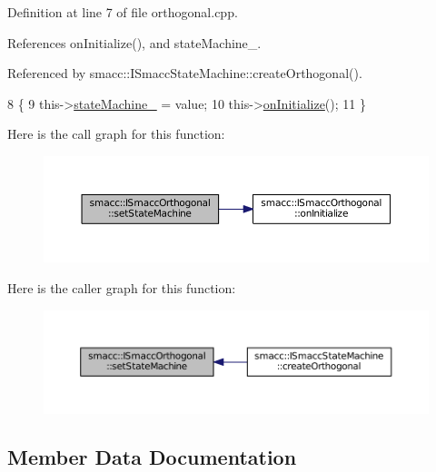 Definition at line 7 of file orthogonal.\+cpp.



References on\+Initialize(), and state\+Machine\+\_\+.



Referenced by smacc\+::\+I\+Smacc\+State\+Machine\+::create\+Orthogonal().


\begin{DoxyCode}
8 \{
9     this->\hyperlink{classsmacc_1_1ISmaccOrthogonal_a418b2e094a65013444ec1fca7e94f28d}{stateMachine\_} = value;
10     this->\hyperlink{classsmacc_1_1ISmaccOrthogonal_a6bb31c620cb64dd7b8417f8705c79c7a}{onInitialize}();
11 \}
\end{DoxyCode}


Here is the call graph for this function\+:
\nopagebreak
\begin{figure}[H]
\begin{center}
\leavevmode
\includegraphics[width=350pt]{classsmacc_1_1ISmaccOrthogonal_a0fa0901a322f62a604c279c06d34f2f0_cgraph}
\end{center}
\end{figure}




Here is the caller graph for this function\+:
\nopagebreak
\begin{figure}[H]
\begin{center}
\leavevmode
\includegraphics[width=350pt]{classsmacc_1_1ISmaccOrthogonal_a0fa0901a322f62a604c279c06d34f2f0_icgraph}
\end{center}
\end{figure}




\subsection{Member Data Documentation}
